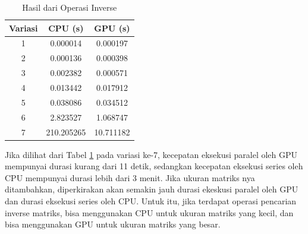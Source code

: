 \begin{table}[H]
	\centering
	\caption{Hasil dari Operasi Inverse}
	\label{tab:result_inverse}
	\begin{tabular}{ccc}
		\toprule
		Variasi & CPU (s)    & GPU (s)   \\
		\midrule
		1       & 0.000014   & 0.000197  \\
		2       & 0.000136   & 0.000398  \\
		3       & 0.002382   & 0.000571  \\
		4       & 0.013442   & 0.017912  \\
		5       & 0.038086   & 0.034512  \\
		6       & 2.823527   & 1.068747  \\
		7       & 210.205265 & 10.711182 \\
		\bottomrule
	\end{tabular}
\end{table}

Jika dilihat dari Tabel \ref{tab:result_inverse} pada variasi ke-7, kecepatan eksekusi paralel oleh GPU mempunyai durasi kurang dari 11 detik, sedangkan kecepatan eksekusi series oleh CPU mempunyai durasi lebih dari 3 menit. Jika ukuran matriks nya ditambahkan, diperkirakan akan semakin jauh durasi ekeskusi paralel oleh GPU dan durasi eksekusi series oleh CPU. Untuk itu, jika terdapat operasi pencarian inverse matriks, bisa menggunakan CPU untuk ukuran matriks yang kecil, dan bisa menggunakan GPU untuk ukuran matriks yang besar.

